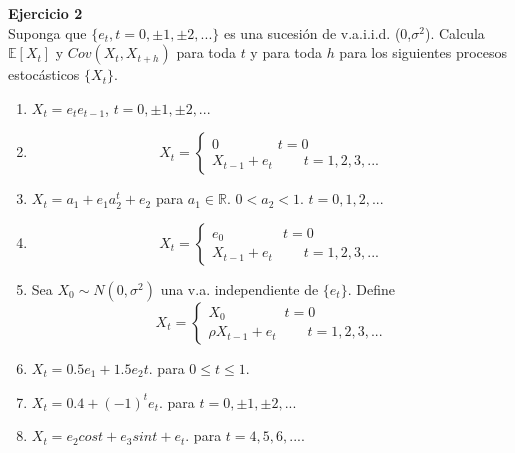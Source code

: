 \documentclass[a4paper, 11pt]{article}
\newenvironment{problem}[2][Ejercicio]
{ \begin{mdframed}[backgroundcolor= red!50] \textbf{#1 #2} \\}
	{  \end{mdframed}}
\begin{document}
\begin{problem}{2}
    Suponga que $\{e_t, t = 0,\pm 1, \pm 2, ...  \}$ es una sucesión de v.a.i.i.d. (0,$\sigma^2$). Calcula $\mathbb{E}[X_t]$ y $Cov(X_t,X_{t+h})$ para toda $t$ y para toda $h$ para los siguientes procesos estocásticos $\{X_t\}$.
    \begin{enumerate}
        \item $X_t = e_t e_{t-1}$, $t= 0,\pm 1, \pm 2,...$
        \item 
        $$
        X_t = \left\{\begin{matrix}
        \!\!\!\!\!\!\!\!\!  0 \:\:\:\:\:\:\:\:\:\:\:\:\:\:\:\:\:\:\:   t =0\\ 
        X_{t-1} + e_t \:\:\:\:\:\:\:\:\:\:  t =1,2,3,...
        \end{matrix}\right.
        $$
        \item $X_t = a_1 + e_1a_2^t+e_2$ para $a_1 \in \mathbb{R}$. $0 < a_2 < 1$. $t = 0,1,2,...$
        \item 
        $$
        X_t = \left\{\begin{matrix}
        \!\!\!\!\!\!\!\!\!  e_0 \:\:\:\:\:\:\:\:\:\:\:\:\:\:\:\:\:\:\:   t =0\\ 
        X_{t-1} + e_t \:\:\:\:\:\:\:\:\:\:  t =1,2,3,...
        \end{matrix}\right.
        $$
        \item Sea $X_0 \sim N(0,\sigma^2)$ una v.a. independiente de $\{e_t\}$. Define
        $$
        X_t = \left\{\begin{matrix}
        \!\!\!\!\!\!\!\!\!  X_0 \:\:\:\:\:\:\:\:\:\:\:\:\:\:\:\:\:\:\:   t =0\\ 
        \rho X_{t-1} + e_t \:\:\:\:\:\:\:\:\:\:  t =1,2,3,...
        \end{matrix}\right.
        $$
        \item $X_t = 0.5  e_1 + 1.5 e_2t$. para $0 \leq t \leq 1$. 
        \item $X_t = 0.4 +(-1)^t e_t$. para $t= 0,\pm1, \pm2,...$
        \item $X_t = e_2 cos t +e_3 sin t + e_t$. para $t= 4,5,6,....$
    \end{enumerate}
\end{problem}
\end{document}
